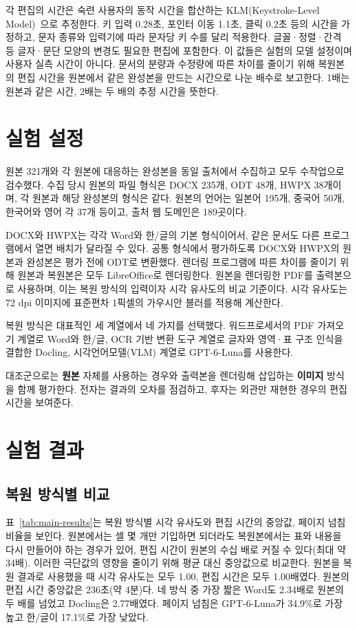 \documentclass{kcc}
\begin{document}
각 편집의 시간은 숙련 사용자의 동작 시간을 합산하는 KLM(Keystroke-Level Model)~\cite{card1980klm}으로 추정한다.
키 입력 0.28초, 포인터 이동 1.1초, 클릭 0.2초 등의 시간을 가정하고, 문자 종류와 입력기에 따라 문자당 키 수를 달리 적용한다.
글꼴·정렬·간격 등 글자·문단 모양의 변경도 필요한 편집에 포함한다.
이 값들은 실험의 모델 설정이며 사용자 실측 시간이 아니다.
문서의 분량과 수정량에 따른 차이를 줄이기 위해 복원본의 편집 시간을 원본에서 같은 완성본을 만드는 시간으로 나눈 배수로 보고한다.
1배는 원본과 같은 시간, 2배는 두 배의 추정 시간을 뜻한다.

\section{실험 설정}

원본 321개와 각 원본에 대응하는 완성본을 동일 출처에서 수집하고 모두 수작업으로 검수했다.
수집 당시 원본의 파일 형식은 DOCX 235개, ODT 48개, HWPX 38개이며, 각 원본과 해당 완성본의 형식은 같다.
원본의 언어는 일본어 195개, 중국어 50개, 한국어와 영어 각 37개 등이고, 출처 웹 도메인은 189곳이다.

DOCX와 HWPX는 각각 Word와 한/글의 기본 형식이어서, 같은 문서도 다른 프로그램에서 열면 배치가 달라질 수 있다.
공통 형식에서 평가하도록 DOCX와 HWPX의 원본과 완성본은 평가 전에 ODT로 변환했다.
렌더링 프로그램에 따른 차이를 줄이기 위해 원본과 복원본은 모두 LibreOffice로 렌더링한다.
원본을 렌더링한 PDF를 출력본으로 사용하며, 이는 복원 방식의 입력이자 시각 유사도의 비교 기준이다.
시각 유사도는 72 dpi 이미지에 표준편차 1픽셀의 가우시안 블러를 적용해 계산한다.

복원 방식은 대표적인 세 계열에서 네 가지를 선택했다.
워드프로세서의 PDF 가져오기 계열로 Word와 한/글, OCR 기반 변환 도구 계열로 글자와 영역·표 구조 인식을 결합한 Docling, 시각언어모델(VLM) 계열로 GPT-6-Luna를 사용한다.

대조군으로는 \textbf{원본} 자체를 사용하는 경우와 출력본을 렌더링해 삽입하는 \textbf{이미지} 방식을 함께 평가한다.
전자는 결과의 오차를 점검하고, 후자는 외관만 재현한 경우의 편집 시간을 보여준다.

\section{실험 결과}

\subsection{복원 방식별 비교}

표~\ref{tab:main-results}는 복원 방식별 시각 유사도와 편집 시간의 중앙값, 페이지 넘침 비율을 보인다.
원본에서는 셀 몇 개만 기입하면 되더라도 복원본에서는 표와 내용을 다시 만들어야 하는 경우가 있어, 편집 시간이 원본의 수십 배로 커질 수 있다(최대 약 34배).
이러한 극단값의 영향을 줄이기 위해 평균 대신 중앙값으로 비교한다.
원본을 복원 결과로 사용했을 때 시각 유사도는 모두 1.00, 편집 시간은 모두 1.00배였다.
원본의 편집 시간 중앙값은 236초(약 4분)다.
네 방식 중 가장 짧은 Word도 2.34배로 원본의 두 배를 넘었고 Docling은 2.77배였다.
페이지 넘침은 GPT-6-Luna가 34.9\%로 가장 높고 한/글이 17.1\%로 가장 낮았다.
\end{document}
